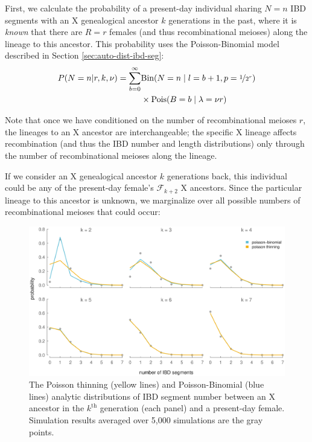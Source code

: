 \documentclass[9pt,twocolumn,twoside]{gsajnl}
\begin{document}
First, we calculate the probability of a present-day individual sharing $N=n$
IBD segments with an X genealogical ancestor $k$ generations in the past, where
it is \emph{known} that there are $R=r$ females (and thus recombinational
meioses) along the lineage to this ancestor. This probability uses the
Poisson-Binomial model described in Section \ref{sec:auto-dist-ibd-seg}:
%
\begin{align}
  P(N=n | r, k, \nu) = \sum_{b=0}^\infty &\text{Bin}(N=n \;|\; l=b+1, p=\nicefrac{1}{2^r}) \nonumber \\
  &\times \text{Pois}(B=b \;|\; \lambda=\nu r)
  \label{eq:likelihood-n}
\end{align}
%

Note that once we have conditioned on the number of recombinational meioses $r$,
the lineages to an X ancestor are interchangeable; the specific X lineage
affects recombination (and thus the IBD number and length distributions) only
through the number of recombinational meioses along the lineage. 

If we consider an X genealogical ancestor $k$ generations back, this individual
could be any of the present-day female's $\mathcal{F}_{k+2}$ X ancestors. Since
the particular lineage to this ancestor is unknown, we marginalize over all
possible numbers of recombinational meioses that could occur:

\begin{figure}[!ht]
  \centering
  \includegraphics[width=\textwidth]{images/x-ancestor-blockcounts}

  \caption{The Poisson thinning (yellow lines) and Poisson-Binomial (blue
  lines) analytic distributions of IBD segment number between an X ancestor in
the $k^\text{th}$ generation (each panel) and a present-day female. Simulation
results averaged over 5,000 simulations are the gray points.}

  \label{fig:x-ancestor-blockcounts}

\end{figure}
\end{document}
